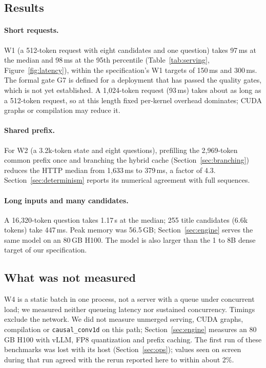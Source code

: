 \subsection{Results}

\paragraph{Short requests.}
W1 (a 512-token request with eight candidates and one question) takes 97\,ms at the median
and 98\,ms at the 95th percentile (Table~\ref{tab:serving}, Figure~\ref{fig:latency}), within
the specification's W1 targets of 150\,ms and 300\,ms. The formal gate G7 is defined for a
deployment that has passed the quality gates, which is not yet established. A 1,024-token
request (93\,ms) takes about as long as a 512-token request, so at this length fixed
per-kernel overhead dominates; CUDA graphs or compilation may reduce it.

\paragraph{Shared prefix.}
For W2 (a 3.2k-token state and eight questions), prefilling the 2,969-token common prefix
once and branching the hybrid cache (Section~\ref{sec:branching}) reduces the HTTP median from
1,633\,ms to 379\,ms, a factor of 4.3. Section~\ref{sec:determinism} reports its numerical
agreement with full sequences.

\paragraph{Long inputs and many candidates.}
A 16,320-token question takes 1.17\,s at the median; 255 title candidates (6.6k tokens) take
447\,ms. Peak memory was 56.5\,GB; Section~\ref{sec:engine} serves the same model on an 80\,GB
H100. The model is also larger than the 1 to 8B dense target of our specification.

\subsection{What was not measured}

W4 is a static batch in one process, not a server with a queue under concurrent load; we
measured neither queueing latency nor sustained concurrency. Timings exclude the network. We
did not measure unmerged serving, CUDA graphs, compilation or \texttt{causal\_conv1d} on this
path; Section~\ref{sec:engine} measures an 80\,GB H100 with vLLM, FP8 quantization and prefix
caching. The first run of these benchmarks
was lost with its host (Section~\ref{sec:ops}); values seen on screen during that run agreed
with the rerun reported here to within about 2\%.
